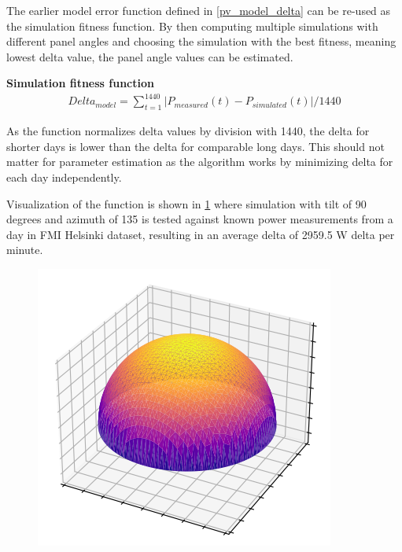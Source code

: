 The earlier model error function defined in \ref{pv_model_delta} can be re-used as the simulation fitness function. By then computing multiple simulations with different panel angles and choosing the simulation with the best fitness, meaning lowest delta value, the panel angle values can be estimated.

\vspace{6mm}
\noindent\textbf{Simulation fitness function}
\begin{equation}
\begin{split}
\label{pv_model_delta}
Delta_{model} = \sum_{t=1}^{1440} |P_{measured}(t) - P_{simulated}(t)| /1440
\end{split}
\end{equation}

\noindent As the function normalizes delta values by division with 1440, the delta for shorter days is lower than the delta for comparable long days. This should not matter for parameter estimation as the algorithm works by minimizing delta for each day independently. 

Visualization of the function is shown in \ref{fig_simulation_fitness} where simulation with tilt of 90 degrees and azimuth of 135 is tested against known power measurements from a day in FMI Helsinki dataset, resulting in an average delta of 2959.5 W delta per minute.



\begin{figure}[h]
\centering
\includegraphics[width=0.8\linewidth]{pics/halfdome} %
\label{fig_simulation_fitness}
\end{figure}




